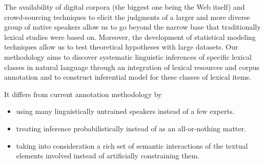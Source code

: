 \documentclass[10pt]{article}
\newcommand{\moveup}{\vspace*{-1.8mm}}
\begin{document}


The availability of digital corpora (the biggest one being the Web itself) and crowd-sourcing techniques to elicit the judgments of a larger and more diverse group of native speakers allow us to go beyond the narrow base that traditionally lexical studies were based on. Moreover, the development of statistical modeling techniques allow us to test theoretical hypotheses with large datasets. Our methodology aims to discover systematic linguistic inferences of specific lexical classes in natural language through an integration of lexical resources and corpus annotation and to construct  inferential model for these classes of lexical items. 

It differs from current annotation methodology by
\begin{itemize}
\moveup
\item using many linguistically untrained speakers instead of a few experts. 
\moveup
\item treating inference probabilistically instead of as an all-or-nothing matter. 
\moveup
\item taking into consideration a rich set of semantic interactions of the textual elements involved instead of artificially constraining them.
\moveup
\end{itemize}


 
\end{document}
